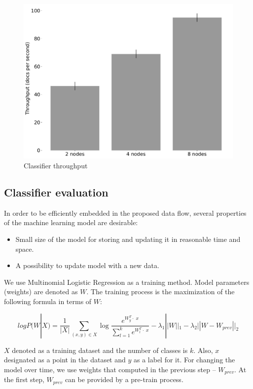 \begin{figure}[htbp]
  \centering
  \includegraphics[scale=0.25]{pics/classifier_throughput}
  \caption{Classifier throughput}
  \label {throughput}
\end{figure}

\subsection{Classifier evaluation}

In order to be efficiently embedded in the proposed data flow, several properties of the machine learning model are desirable:
\begin{itemize}
     \item Small size of the model for storing and updating it in reasonable time and space.
     \item A possibility to update model with a new data.
\end{itemize}

We use Multinomial Logistic Regression as a training method. Model parameters (weights) are denoted as $W$. The training process is the maximization of the following formula in terms of $W$:

$$ logP(W | X) = \frac{1}{|X|} \sum \limits_{(x, y) \in X} \log \frac{e^{{W_y^T \cdot \; x}}}{\sum \limits_{l = 1}^{k}  e^{{W_{l}^T \cdot \; x}}} - \lambda_1 ||W||_1 - \lambda_2 ||W - W_{prev}||_2 $$ 

$X$ denoted as a training dataset and the number of classes is $k$. Also, $x$ designated as a point in the dataset and $y$ as a label for it. For changing the model over time, we use weights that computed in the previous step -- $W_{prev}$. At the first step, $W_{prev}$ can be provided by a pre-train process.

